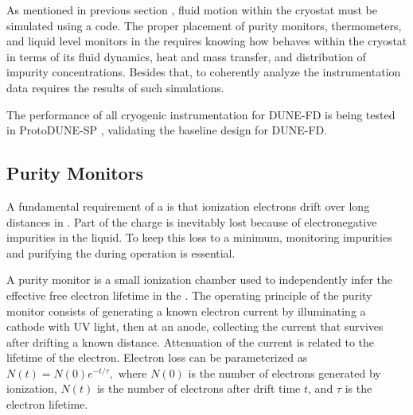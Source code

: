 As mentioned in previous section  , fluid motion within the cryostat must be simulated using a  code.
The proper placement of purity monitors, thermometers, and liquid level monitors in the  requires knowing how  behaves within the cryostat in terms of its fluid dynamics, heat and mass transfer, and distribution of impurity concentrations. Besides that, to coherently analyze the instrumentation data requires the results of such simulations.

The performance of all cryogenic instrumentation for DUNE-FD  is being tested in ProtoDUNE-SP  , validating the baseline design for DUNE-FD.



\subsection{Purity Monitors}
\label{sec:fdgen-slow-cryo-purity-mon}

A fundamental requirement of a   is that ionization electrons drift over long distances in . Part of the charge is inevitably lost because of electronegative impurities in the liquid. To keep this loss to a minimum, monitoring impurities and purifying the  during operation is essential.




A purity monitor is a small ionization chamber used to independently  infer the effective free electron lifetime in the \lartpc.  The operating principle of the purity monitor consists of generating a known electron current by illuminating a cathode with UV  light, then at an anode, collecting  the current that survives after drifting a known distance.  Attenuation of the current is related to the lifetime of the electron.
Electron loss can be parameterized as
%
\(N(t) = N(0)e^{-t/\tau},\)
%
where $N(0)$ is the number of electrons generated by ionization, $N(t)$ is the number of electrons after drift time $t$, and $\tau$ is the electron lifetime. 

